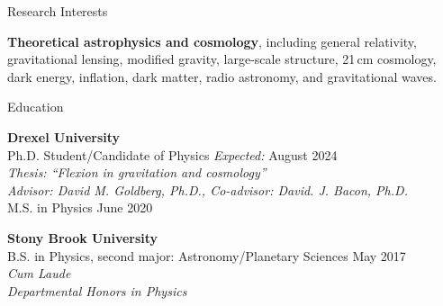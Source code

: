 \documentclass{resume} %
\begin{document}


\begin{rSection}{Research Interests}

\textbf{Theoretical astrophysics and cosmology}, including general relativity, gravitational lensing, modified gravity, large-scale structure, 21\,cm cosmology, dark energy, inflation, dark matter, radio astronomy, and gravitational waves. 

\end{rSection}


\begin{rSection}{Education}

\textbf{Drexel University} \\%
{\color{MidnightBlue} Ph.D.} Student/Candidate of Physics \hfill {\textit{Expected:} August 2024} \\
\textit{Thesis: ``Flexion in gravitation and cosmology''}\\
\textit{Advisor: David M. Goldberg, Ph.D., Co-advisor: David. J. Bacon, Ph.D.}\\
{\color{MidnightBlue} M.S.} in Physics \hfill{June 2020}%

\textbf{Stony Brook University} \\%
{\color{MidnightBlue} B.S.} in Physics, second major: Astronomy/Planetary Sciences \hfill{May 2017}\\%
\textit{Cum Laude}\\
\textit{Departmental Honors in Physics}

\end{rSection}

\end{document}
